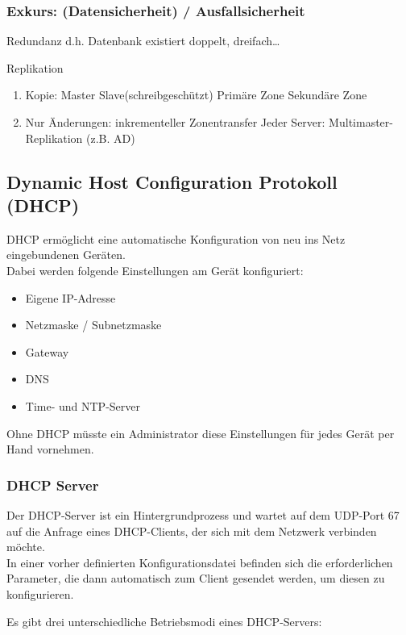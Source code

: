 \documentclass[10pt]{article}
\begin{document}
\subsubsection{Exkurs: (Datensicherheit) / Ausfallsicherheit}

\textrightarrow\space Redundanz d.h. Datenbank existiert doppelt, dreifach…

\textrightarrow\space Replikation
\begin{enumerate}
    \item Kopie: Master \textrightarrow\space Slave(schreibgeschützt)
	             Primäre Zone \textrightarrow\space Sekundäre Zone
    \item Nur Änderungen: inkrementeller Zonentransfer
Jeder Server: Multimaster-Replikation (z.B. AD)
\end{enumerate}
	

\subsection{Dynamic Host Configuration Protokoll (DHCP)}

DHCP ermöglicht eine automatische Konfiguration von neu ins Netz eingebundenen Geräten.\\
Dabei werden folgende Einstellungen am Gerät konfiguriert:

\begin{itemize}
    \item Eigene IP-Adresse
    \item Netzmaske / Subnetzmaske 
    \item Gateway
    \item DNS
    \item Time- und NTP-Server
\end{itemize}

Ohne DHCP müsste ein Administrator diese Einstellungen für jedes Gerät per Hand vornehmen.

\subsubsection{DHCP Server}
Der DHCP-Server ist ein Hintergrundprozess und wartet auf dem UDP-Port 67 auf die Anfrage eines DHCP-Clients, der sich mit dem Netzwerk verbinden möchte.\\
In einer vorher definierten Konfigurationsdatei befinden sich die erforderlichen Parameter, die dann automatisch zum Client gesendet werden, um diesen zu konfigurieren.

Es gibt drei unterschiedliche Betriebsmodi eines DHCP-Servers:
\end{document}
